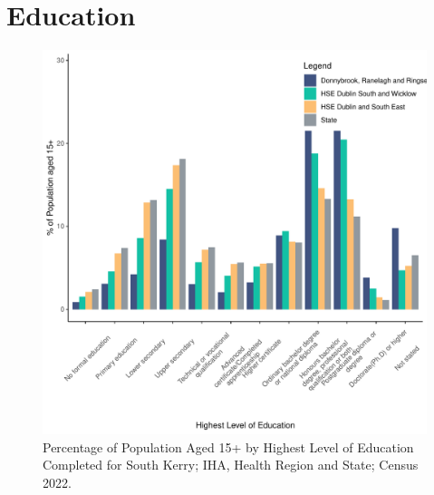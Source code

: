 \documentclass{article}
\begin{document}
\section{Education}\label{sect:Edu}
\begin{figure}[H]
	\centering
	\includegraphics[width = 120mm]{../figures/EduED.pdf}
	\caption{Percentage of Population Aged 15+ by Highest Level of Education Completed for South Kerry; IHA, Health Region and State; Census 2022.}
	\label{fig:vbnv}
	\end{figure}
\end{document}
